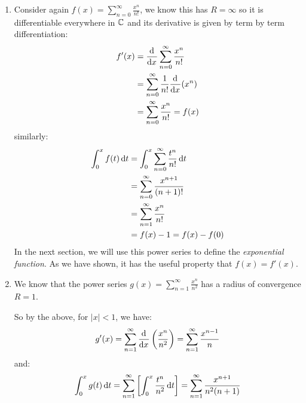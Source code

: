 \documentclass[../main.tex]{subfiles}
\begin{document}
\begin{example}
  \begin{enumerate} \label{expExample}
    \item Consider again $f(x) = \sum_{n = 0}^{\infty} \frac{x^{n}}{n!}$, we know this has $R = \infty$ so it is differentiable everywhere in $\mathbb{C}$ and its derivative is given by term by term differentiation:
      \begin{align*}
        f'(x) &= \deriv{}{x} \sum_{n = 0}^{\infty} \frac{x^{n}}{n!} \\
              &= \sum_{n = 0}^{\infty} \frac{1}{n!}\deriv{}{x}(x^{n}) \\
              &= \sum_{n = 0}^{\infty} \frac{x^{n}}{n!} = f(x)
      \end{align*}
      similarly:
      \begin{align*}
        \int_{0}^{x} f(t) \d{t} &= \int_{0}^{x} \sum_{n = 0}^{\infty} \frac{t^{n}}{n!} \d{t} \\
                                &= \sum_{n = 0}^{\infty} \frac{x^{n + 1}}{(n + 1)!} \\
                                &= \sum_{n = 1}^{\infty} \frac{x^{n}}{n!} \\
                                &= f(x) - 1 = f(x) - f(0)
      \end{align*}
      In the next section, we will use this power series to define the \textit{exponential function}.
      As we have shown, it has the useful property that $f(x) = f'(x)$.
    \item We know that the power series $g(x) = \sum_{n = 1}^{\infty} \frac{x^{n}}{n^2}$ has a radius of convergence $R = 1$.

      So by the above, for $|x| < 1$, we have:
      \[
        g'(x) = \sum_{n = 1}^{\infty} \deriv{}{x}\left(\frac{x^{n}}{n^2}\right) = \sum_{n = 1}^{\infty} \frac{x^{n - 1}}{n}
      \]
      and:
      \[
        \int_{0}^{x} g(t) \d{t} = \sum_{n = 1}^{\infty} \left[\int_{0}^{x} \frac{t^{n}}{n^2} \d{t}\right] = \sum_{n = 1}^{\infty} \frac{x^{n + 1}}{n^2(n + 1)}
      \]
  \end{enumerate}
\end{example}
\end{document}
